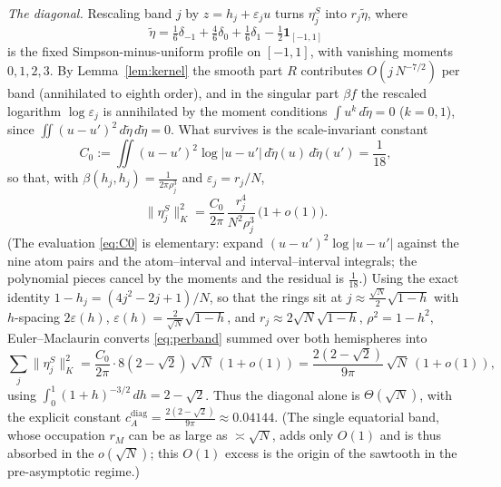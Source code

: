 \documentclass[11pt,reqno]{amsart}
\theoremstyle{definition}
\newcommand{\eps}{\varepsilon}
\newcommand{\abs}[1]{\lvert #1\rvert}
\newcommand{\rp}{\rho}
\begin{document}
\emph{The diagonal.} Rescaling band $j$ by $z=h_j+\eps_j u$ turns $\eta_j^S$ into $r_j\tilde\eta$,
where
\[
   \tilde\eta=\tfrac16\delta_{-1}+\tfrac46\delta_{0}+\tfrac16\delta_{1}-\tfrac12\mathbf 1_{[-1,1]}
\]
is the fixed Simpson-minus-uniform profile on $[-1,1]$, with vanishing moments $0,1,2,3$. By
Lemma~\ref{lem:kernel} the smooth part $R$ contributes $O(j\,N^{-7/2})$ per band (annihilated to
eighth order), and in the singular part $\beta f$ the rescaled logarithm $\log\eps_j$ is annihilated by
the moment conditions $\int u^k\,d\tilde\eta=0$ ($k=0,1$), since
$\iint(u-u')^2\,d\tilde\eta\,d\tilde\eta=0$. What survives is the scale-invariant constant
\begin{equation}\label{eq:C0}
   C_0:=\iint(u-u')^2\log\abs{u-u'}\,d\tilde\eta(u)\,d\tilde\eta(u')=\frac1{18},
\end{equation}
so that, with $\beta(h_j,h_j)=\tfrac1{2\pi\rp_j^3}$ and $\eps_j=r_j/N$,
\begin{equation}\label{eq:perband}
   \lVert\eta_j^S\rVert_K^2=\frac{C_0}{2\pi}\,\frac{r_j^{4}}{N^{2}\rp_j^{3}}\,\bigl(1+o(1)\bigr).
\end{equation}
(The evaluation \eqref{eq:C0} is elementary: expand $(u-u')^2\log\abs{u-u'}$ against the nine atom
pairs and the atom--interval and interval--interval integrals; the polynomial pieces cancel by the
moments and the residual is $\tfrac1{18}$.) Using the exact identity $1-h_j=(4j^2-2j+1)/N$, so that
the rings sit at $j\approx\tfrac{\sqrt N}2\sqrt{1-h}$ with $h$-spacing $2\eps(h)$,
$\eps(h)=\tfrac2{\sqrt N}\sqrt{1-h}$, and $r_j\approx 2\sqrt N\sqrt{1-h}$, $\rp^2=1-h^2$,
Euler--Maclaurin converts \eqref{eq:perband} summed over both hemispheres into
\begin{equation}\label{eq:diagconst}
   \sum_j\lVert\eta_j^S\rVert_K^2
   =\frac{C_0}{2\pi}\cdot 8(2-\sqrt2)\,\sqrt N\,(1+o(1))
   =\frac{2(2-\sqrt2)}{9\pi}\,\sqrt N\,(1+o(1)),
\end{equation}
using $\int_0^1(1+h)^{-3/2}\,dh=2-\sqrt2$. Thus the diagonal alone is $\Theta(\sqrt N)$, with the
explicit constant $c_A^{\mathrm{diag}}=\frac{2(2-\sqrt2)}{9\pi}\approx0.04144$. (The single equatorial
band, whose occupation $r_M$ can be as large as $\asymp\sqrt N$, adds only $O(1)$ and is thus
absorbed in the $o(\sqrt N)$; this $O(1)$ excess is the origin of the sawtooth in the pre-asymptotic
regime.)
\end{document}
